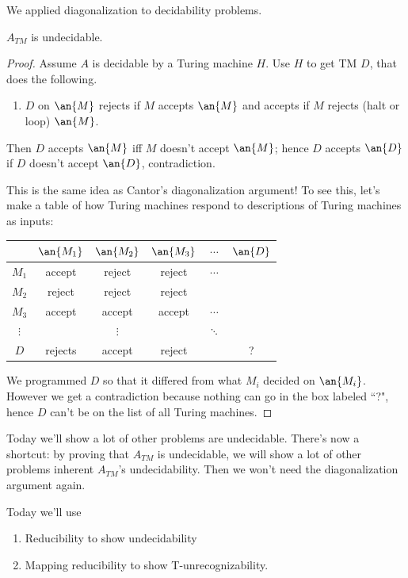 We applied diagonalization to decidability problems.
\begin{thm}
$A_{TM}$ is undecidable.
\end{thm}
\begin{proof}
Assume $A$ is decidable by a Turing machine $H$.
Use $H$ to get TM $D$, that does the following.
\begin{enumerate}
\item
$D$ on $\an{M}$ rejects if $M$ accepts $\an{M}$ and accepts if $M$ rejects (halt or loop) $\an{M}$.
\end{enumerate}
Then $D$ accepts $\an{M}$ iff $M$ doesn't accept $\an{M}$; hence $D$ accepts $\an{D}$ if $D$ doesn't accept $\an{D}$, contradiction. 

This is the same idea as Cantor's diagonalization argument! To see this, let's make a table of how Turing machines respond to descriptions of Turing machines as inputs:

\begin{center}
\begin{tabular}{c|c|c|c|c|c|}
 & $\an{M_{1}}$ & $\an{M_{2}}$ & $\an{M_{3}}$ & $\cdots$ & $\an{D}$\tabularnewline
\hline 
$M_{1}$ &{\color{red} accept} & reject & reject & $\cdots$ & \tabularnewline
\hline 
$M_{2}$ & reject & {\color{red}reject} & reject &  & \tabularnewline
\hline 
$M_{3}$ & accept & accept &{\color{red}accept} & $\cdots$ & \tabularnewline
\hline 
$\vdots$ &  & $\vdots$ &  & $\ddots$ & \tabularnewline
\hline 
$D$ & rejects & accept & reject &  & ?\tabularnewline
\hline 
\end{tabular}
\end{center}

We programmed $D$ so that it differed from what $M_i$ decided on $\an{M_i}$. However we get a contradiction because nothing can go in the box labeled ``?", hence $D$ can't be on the list of all Turing machines.
\end{proof}

Today we'll show a lot of other problems are undecidable. There's now a shortcut: by proving that $A_{TM}$ is undecidable, we will show a lot of other problems inherent $A_{TM}$'s undecidability. Then we won't need the diagonalization argument again. %

Today we'll use
\begin{enumerate}
\item
Reducibility to show undecidability
\item
Mapping reducibility to show T-unrecognizability.
\end{enumerate}

